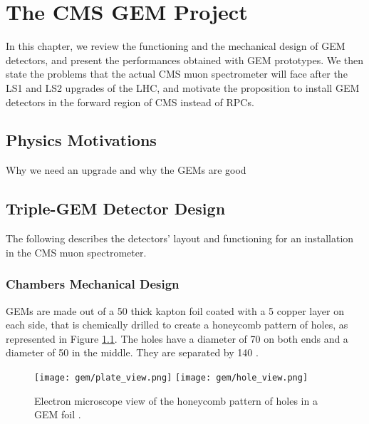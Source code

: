 \chapter{The CMS GEM Project}
\label{chap:gem}

    In this chapter, we review the functioning and the mechanical design of GEM detectors, and present the performances obtained with GEM prototypes. We then state the problems that the actual CMS muon spectrometer will face after the LS1 and LS2 upgrades of the LHC, and motivate the proposition to install GEM detectors in the forward region of CMS instead of RPCs.

    \section{Physics Motivations}

        Why we need an upgrade and why the GEMs are good

    \section{Triple-GEM Detector Design}

        The following describes the detectors' layout and functioning for an installation in the CMS muon spectrometer.

        \subsection{Chambers Mechanical Design}

            GEMs \Cite{GEM_Technical_Proposal, GEM_Construction, GEM_Construction_and_Performance} are made out of a 50 \um{} thick kapton foil coated with a 5 \um{} copper layer on each side, that is chemically drilled to create a honeycomb pattern of holes, as represented in Figure \ref{fig:gas_electron_multiplier_detectors__construction}. The holes have a diameter of 70 \um{} on both ends and a diameter of 50 \um{} in the middle. They are separated by 140 \um{}. \\

            \begin{figure}[h!]
                \centering
                \texttt{[image: gem/plate\_view.png]}
                \texttt{[image: gem/hole\_view.png]}
                \caption{Electron microscope view of the honeycomb pattern of holes in a GEM foil \Cite{GEM_Construction}.}
                \label{fig:gas_electron_multiplier_detectors__construction}
            \end{figure}    

